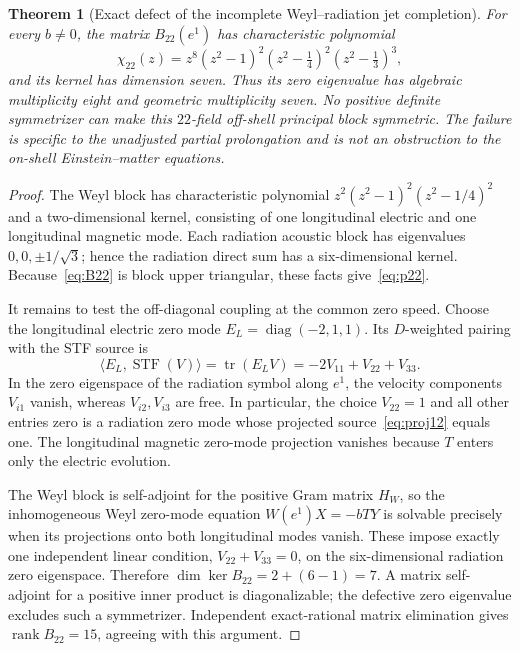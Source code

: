\documentclass[11pt,a4paper]{article}
\newtheorem{theorem}{Theorem}[section]
\newcommand{\STF}{\operatorname{STF}}
\begin{document}
\begin{theorem}[Exact defect of the incomplete Weyl--radiation jet completion]\label{thm:a12jordan}
For every $b\ne0$, the matrix $B_{22}(e^1)$ has characteristic polynomial
\begin{equation}\label{eq:p22}
\chi_{22}(z)=z^8(z^2-1)^2(z^2-\tfrac14)^2(z^2-\tfrac13)^3,
\end{equation}
and its kernel has dimension seven. Thus its zero eigenvalue has algebraic multiplicity eight and geometric multiplicity seven. No positive definite symmetrizer can make this $22$-field off-shell principal block symmetric. The failure is specific to the unadjusted partial prolongation and is not an obstruction to the on-shell Einstein--matter equations.
\end{theorem}
\begin{proof}
The Weyl block has characteristic polynomial $z^2(z^2-1)^2(z^2-1/4)^2$ and a two-dimensional kernel, consisting of one longitudinal electric and one longitudinal magnetic mode. Each radiation acoustic block has eigenvalues $0,0,\pm1/\sqrt3$; hence the radiation direct sum has a six-dimensional kernel. Because~\eqref{eq:B22} is block upper triangular, these facts give~\eqref{eq:p22}.

It remains to test the off-diagonal coupling at the common zero speed. Choose the longitudinal electric zero mode $E_L=\operatorname{diag}(-2,1,1)$. Its $D$-weighted pairing with the STF source is
\begin{equation}\label{eq:proj12}
\langle E_L,\STF(V)\rangle=\operatorname{tr}(E_LV)
=-2V_{11}+V_{22}+V_{33}.
\end{equation}
In the zero eigenspace of the radiation symbol along $e^1$, the velocity components $V_{i1}$ vanish, whereas $V_{i2},V_{i3}$ are free. In particular, the choice $V_{22}=1$ and all other entries zero is a radiation zero mode whose projected source~\eqref{eq:proj12} equals one. The longitudinal magnetic zero-mode projection vanishes because $T$ enters only the electric evolution.

The Weyl block is self-adjoint for the positive Gram matrix $H_W$, so the inhomogeneous Weyl zero-mode equation $W(e^1)X=-bTY$ is solvable precisely when its projections onto both longitudinal modes vanish. These impose exactly one independent linear condition, $V_{22}+V_{33}=0$, on the six-dimensional radiation zero eigenspace. Therefore
$\dim\ker B_{22}=2+(6-1)=7$.
A matrix self-adjoint for a positive inner product is diagonalizable; the defective zero eigenvalue excludes such a symmetrizer. Independent exact-rational matrix elimination gives $\operatorname{rank}B_{22}=15$, agreeing with this argument.
\end{proof}
\end{document}
